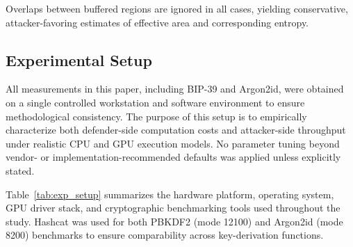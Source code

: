 \documentclass[journal,article,submit,pdftex,moreauthors]{Definitions/mdpi}
\begin{document}
Overlaps between buffered regions are ignored in all cases, yielding conservative, attacker-favoring estimates of effective area and corresponding entropy.


\subsection{Experimental Setup}
\label{sec:experimental_setup}

All measurements in this paper, including BIP-39 and Argon2id, were obtained on a single controlled workstation and software environment to ensure methodological consistency. The purpose of this setup is to empirically characterize both defender-side computation costs and attacker-side throughput under realistic CPU and GPU execution models. No parameter tuning beyond vendor- or implementation-recommended defaults was applied unless explicitly stated.

Table~\ref{tab:exp_setup} summarizes the hardware platform, operating system, GPU driver stack, and cryptographic benchmarking tools used throughout the study. Hashcat was used for both PBKDF2 (mode 12100) and Argon2id (mode 8200) benchmarks to ensure comparability across key-derivation functions.
\end{document}
